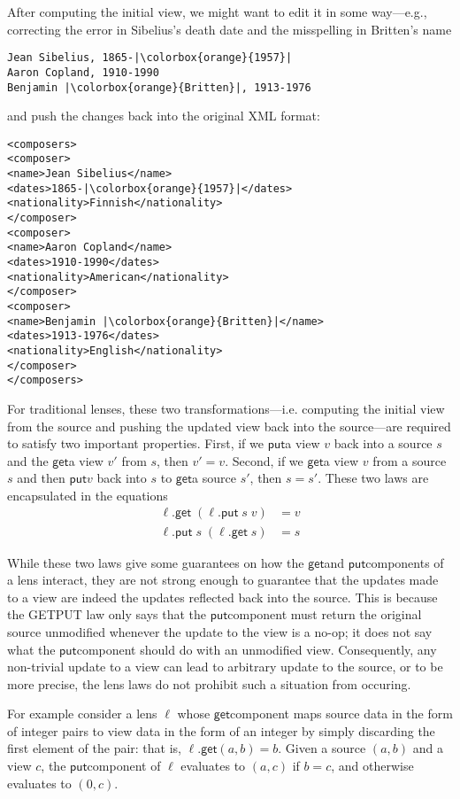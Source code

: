 \documentclass[acmsmall,review,anonymous]{acmart}\settopmatter{printfolios=true,printccs=false,printacmref=false}
\newcommand{\kw}[1]{\ensuremath{\mathsf{#1}}}
\newcommand{\get}{\ensuremath{\kw{get}}}
\newcommand{\pput}{\ensuremath{\kw{put}}}
\begin{document}
After computing the initial view, we might want to edit it in some way---e.g.,
correcting the error in Sibelius's death date and the misspelling in Britten's
name
\begin{lstlisting}
Jean Sibelius, 1865-|\colorbox{orange}{1957}|
Aaron Copland, 1910-1990
Benjamin |\colorbox{orange}{Britten}|, 1913-1976
\end{lstlisting}
and push the changes back into the original XML format:
\begin{lstlisting}
<composers>
<composer>
<name>Jean Sibelius</name>
<dates>1865-|\colorbox{orange}{1957}|</dates>
<nationality>Finnish</nationality>
</composer>
<composer>
<name>Aaron Copland</name>
<dates>1910-1990</dates>
<nationality>American</nationality>
</composer>
<composer>
<name>Benjamin |\colorbox{orange}{Britten}|</name>
<dates>1913-1976</dates>
<nationality>English</nationality>
</composer>
</composers>
\end{lstlisting}

For traditional lenses, these two transformations---i.e. computing the initial
view from the source and pushing the updated view back into the source---are
required to satisfy two important properties. First, if we \pput a view $v$
back into a source $s$ and the \get a view $v'$ from $s$, then $v' = v$. Second,
if we \get a view $v$ from a source $s$ and then \pput $v$ back into $s$ to \get a
source $s'$, then $s = s'$. These two laws are encapsulated in the equations
\begin{align}
\ell.\get \; (\ell.\pput \; s \; v) &= v \tag{PUTGET}\\
\ell.\pput \; s \; (\ell.\get \; s) &= s \tag{GETPUT}
\end{align}

While these two laws give some guarantees on how the \get and \pput components
of a lens interact, they are not strong enough to guarantee that the
updates made to a view are indeed the updates reflected back into the source.
This is because the GETPUT law only says that the \pput component must return
the original source unmodified whenever the update to the view is a no-op; it
does not say what the \pput component should do with an unmodified view.
Consequently, any non-trivial update to a view can lead to arbitrary update to
the source, or to be more precise, the lens laws do not prohibit such a
situation from occuring.

For example consider a lens $\ell$ whose \get component maps source data in the
form of integer pairs to view data in the form of an integer by simply
discarding the first element of the pair: that is, $\ell.\get (a, b) = b$. Given
a source $(a, b)$ and a view $c$, the \pput component of $\ell$ evaluates to
$(a, c)$ if $b=c$, and otherwise evaluates to $(0, c)$.
\end{document}

